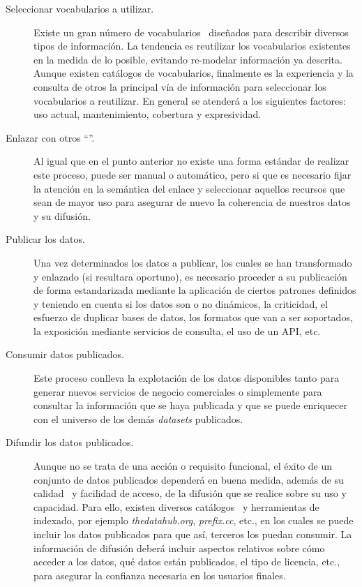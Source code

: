 \begin{description}
\item [Seleccionar vocabularios a utilizar.] Existe un gran número de vocabularios~\cite{dcat-group} diseñados para describir
diversos tipos de información. La tendencia es reutilizar los vocabularios existentes~\cite{lod-stats} en la medida de lo posible, 
evitando re-modelar información ya descrita. Aunque existen catálogos de vocabularios, finalmente es la experiencia
y la consulta de otros \datasets la principal vía de información para seleccionar los vocabularios a reutilizar.
En general se atenderá a los siguientes factores: uso actual, mantenimiento, cobertura y expresividad.

\item [Enlazar con otros ``\datasets''.] Al igual que en el punto anterior no existe una forma estándar
de realizar este proceso, puede ser manual o automático, pero si que es necesario fijar la atención en la semántica del enlace y seleccionar aquellos recursos que sean
de mayor uso para asegurar de nuevo la coherencia de nuestros datos y su difusión.

\item [Publicar los datos.] Una vez determinados los datos a publicar, los cuales se han transformado y enlazado (si resultara oportuno), es
necesario proceder a su publicación de forma estandarizada mediante la aplicación de ciertos patrones definidos y teniendo en cuenta
si los datos son o no dinámicos, la criticidad, el esfuerzo de duplicar bases de datos, los formatos que van a ser soportados,
la exposición mediante servicios de consulta, el uso de un API, etc.
\item [Consumir datos publicados.] Este proceso conlleva la explotación de los datos disponibles tanto para generar
nuevos servicios de negocio comerciales o simplemente para consultar la información que se haya publicada y que se 
puede enriquecer con el universo de los demás \textit{datasets} publicados.
\item [Difundir los datos publicados.] Aunque no se trata de una acción o requisito funcional, el éxito de un conjunto
de datos publicados dependerá en buena medida, además de su calidad~\cite{ld-quality} y facilidad de acceso, de la difusión que se realice
sobre su uso y capacidad. Para ello, existen diversos catálogos~\cite{TummarelloDO07} y herramientas de indexado, por ejemplo
\textit{thedatahub.org}, \textit{prefix.cc}, etc., en los cuales se puede incluir los datos publicados para que así, terceros 
los puedan consumir. La información de difusión deberá incluir aspectos relativos sobre cómo acceder a los datos, qué datos están publicados, el tipo de licencia, etc., para asegurar la confianza necesaria en los usuarios finales.

\end{description}

